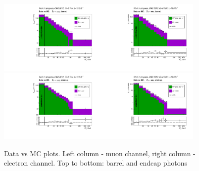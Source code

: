 \begin{figure}[htb]
  \begin{center}
   \includegraphics[width=0.45\textwidth]{../figs/figs_v11/MUON_ZGamma/PrepareYields/c_TotalDATAvsMC_Barrel__phoEt.pdf}\includegraphics[width=0.45\textwidth]{../figs/figs_v11/ELECTRON_ZGamma/PrepareYields/c_TotalDATAvsMC_Barrel__phoEt.pdf}
   \includegraphics[width=0.45\textwidth]{../figs/figs_v11/MUON_ZGamma/PrepareYields/c_TotalDATAvsMC_Endcap__phoEt.pdf}\includegraphics[width=0.45\textwidth]{../figs/figs_v11/ELECTRON_ZGamma/PrepareYields/c_TotalDATAvsMC_Endcap__phoEt.pdf}
  \caption{Data vs MC plots. Left column - muon channel, right column - electron channel. Top to bottom: barrel and endcap photons}
  \label{fig:DATAvsMC_Zg}
  \end{center}
\end{figure}

